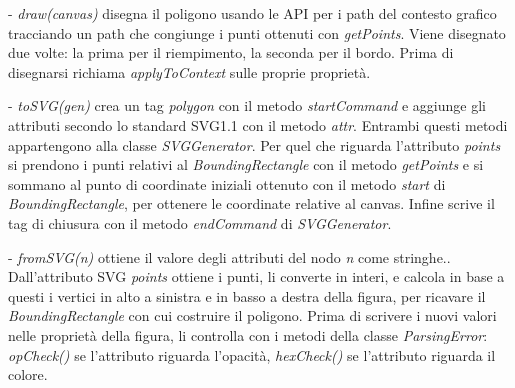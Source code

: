 \begin{elencopuntato}[\subsubsecindent]
\item[-] \textit{draw(canvas)} disegna il poligono usando le API per i path del contesto grafico tracciando  un path che congiunge i punti ottenuti con \textit{getPoints}. Viene disegnato due volte: la prima per il riempimento, la seconda per il bordo. Prima di disegnarsi richiama \textit{applyToContext} sulle proprie propriet\`a.
\item[-] \textit{toSVG(gen)} crea un tag \textit{polygon} con il metodo \textit{startCommand} e aggiunge gli attributi secondo lo standard SVG1.1 con il metodo \textit{attr}. Entrambi questi metodi appartengono alla classe \textit{SVGGenerator}. Per quel che riguarda l'attributo \textit{points} si prendono i punti relativi al \textit{BoundingRectangle} con il metodo \textit{getPoints} e si sommano al punto di coordinate iniziali ottenuto con il metodo \textit{start} di \textit{BoundingRectangle}, per ottenere le coordinate relative al canvas. Infine scrive il tag di chiusura con il metodo \textit{endCommand} di \textit{SVGGenerator}.
\item[-] \textit{fromSVG(n)} ottiene il valore degli attributi del nodo \textit{n} come stringhe.. Dall'attributo SVG \textit{points} ottiene i punti, li converte in interi, e calcola in base a questi i vertici in alto a sinistra e in basso a destra della figura, per ricavare il \textit{BoundingRectangle} con cui costruire il poligono. Prima di scrivere i nuovi valori nelle propriet\`a della figura, li controlla con i metodi della classe \textit{ParsingError}: \textit{opCheck()} se l'attributo riguarda l'opacit\`a, \textit{hexCheck()} se l'attributo riguarda il colore.
\end{elencopuntato}

